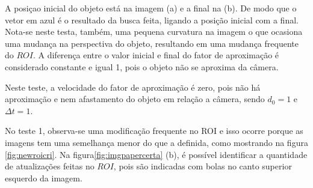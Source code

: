A posiçao inicial do objeto está na imagem (a) e a final na (b). De modo que o
vetor em azul é o resultado da busca feita, ligando a posição inicial com a final.
Nota-se neste testa, também, uma pequena curvatura na imagem o que ocasiona uma mudança
na perspectiva do objeto, resultando em uma mudança frequente do $ROI$.
A diferença entre o valor inicial e final do fator de aproximação é considerado constante
e igual 1, pois o objeto não se aproxima da câmera.

Neste teste, a velocidade do fator de aproximação é zero, pois não há aproximação e nem
afastamento do objeto em relação a câmera, sendo $d_0=1$ e $\Delta t=1$.

No teste 1, observa-se uma modificação frequente no ROI e isso ocorre porque as imagens 
tem uma semelhança menor do que a definida, como mostrando na figura \ref{fig:newroicri}. 
Na figura\ref{fig:imgpapercerta} (b), é possível identificar a quantidade de atualizações feitas no $ROI$,
 pois são indicadas com bolas no canto superior esquerdo da imagem.
